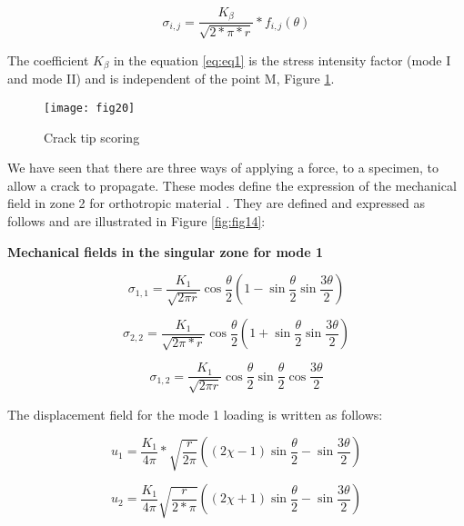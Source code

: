 \begin{equation}
	\sigma_{i,j} = \frac{K_{\beta}}{\sqrt{2*\pi*r}}*f_{i,j}(\theta)
	\label{eq:eq1}
\end{equation}

The coefficient $K_\beta$ in the equation \ref{eq:eq1} is the stress intensity factor (mode I and mode II) and is independent of the point M, Figure \ref{fig:fig20}.

\graphicspath{{Images/}}
\begin{figure}[htp]
	\centering
	\texttt{[image: fig20]}
	\caption{Crack tip scoring}
	\label{fig:fig20}
\end{figure}

We have seen that there are three ways of applying a force, to a specimen, to allow a crack to propagate. These modes define the expression of the mechanical field in zone 2 for orthotropic material \cite{Reference9}. They are defined and expressed as follows and are illustrated in Figure \ref{fig:fig14}:

\textbf{Mechanical fields in the singular zone for mode 1}

\begin{equation}
	\sigma_{1,1} = \frac{K_{1}}{\sqrt{2 \pi r}} \cos{\frac{\theta}{2}}  \left( 1-\sin{\frac{\theta}{2}} \sin{\frac{3 \theta}{2}} \right)
\end{equation}

\begin{equation}
	\sigma_{2,2} = \frac{K_{1}}{\sqrt{2 \pi*r}} \cos{\frac{\theta}{2}}  \left( 1+\sin{\frac{\theta}{2}} \sin{\frac{3 \theta}{2}} \right)
\end{equation}

\begin{equation}
	\sigma_{1,2} = \frac{K_{1}}{\sqrt{2 \pi r}} \cos{\frac{\theta}{2}}  \sin{\frac{\theta}{2}} \cos{\frac{3 \theta}{2}}
\end{equation}

The displacement field for the mode 1 loading is written as follows:

\begin{equation}
	u_{1} = \frac{K_{1}}{4 \pi}*\sqrt{\frac{r}{2 \pi}} \left((2 \chi-1) \sin{\frac{\theta}{2}}-\sin{\frac{3 \theta}{2}}\right)
\end{equation}

\begin{equation}
	u_{2} = \frac{K_{1}}{4 \pi} \sqrt{\frac{r}{2*\pi}} \left((2 \chi+1) \sin{\frac{\theta}{2}}-\sin{\frac{3 \theta}{2}}\right)
\end{equation}

